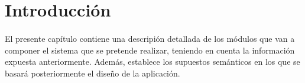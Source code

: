 \section{Introducción}

\paragraph{}El presente capítulo contiene una descripión detallada de los
módulos que van a componer el sistema que se pretende realizar, teniendo en
cuenta la información expuesta anteriormente. Además, establece los supuestos
semánticos en los que se basará posteriormente el diseño de la aplicación.
